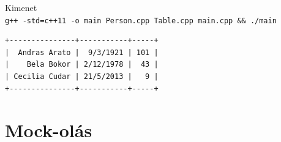 \documentclass[usenames,dvipsnames,aspectratio=169]{beamer}
\begin{document}
\begin{frame}
    \begin{exampleblock}{}
        \footnotesize
        
    \end{exampleblock}
\end{frame}

\begin{frame}
    \begin{exampleblock}{}
        \footnotesize
        
    \end{exampleblock}
\end{frame}

\begin{frame}
    \begin{exampleblock}{}
        \small
        
    \end{exampleblock}
\end{frame}

\begin{frame}[fragile]
    \begin{block}{Kimenet \\ \texttt{g++ -std=c++11 -o main Person.cpp Table.cpp main.cpp \&\& ./main}}
        \begin{verbatim}
+---------------+-----------+-----+
|  Andras Arato |  9/3/1921 | 101 |
|    Bela Bokor | 2/12/1978 |  43 |
| Cecilia Cudar | 21/5/2013 |   9 |
+---------------+-----------+-----+
\end{verbatim}
    \end{block}
\end{frame}

\section{Mock-olás}
\end{document}
